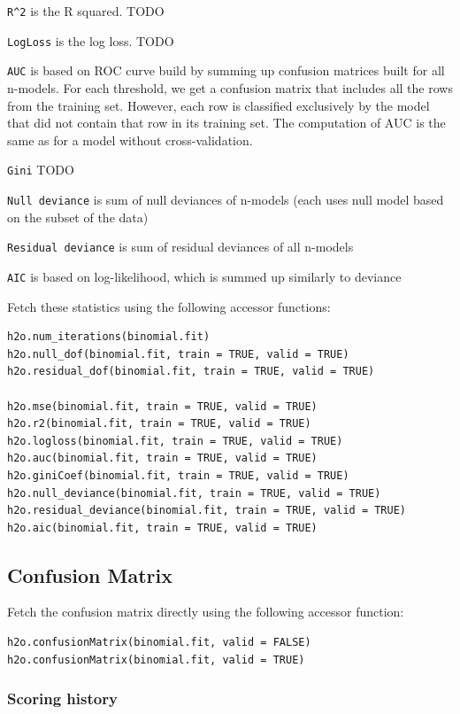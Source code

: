 \texttt{R\textasciicircum2} is the R squared.  TODO

\texttt{LogLoss} is the log loss.  TODO

\texttt{AUC} is based on ROC curve build  by summing up confusion matrices built for all n-models.
For each threshold, we get a confusion matrix that includes all the rows from the training set. However, each row
is classified exclusively by the model that did not contain that row in its training set. The computation of AUC is
the same as for a model without cross-validation.

\texttt{Gini}  TODO

\texttt{Null deviance} is sum of null deviances of n-models (each uses null model based on the subset of the data)

\texttt{Residual deviance} is sum of residual deviances of all n-models

\texttt{AIC} is based on log-likelihood, which is summed up similarly to deviance

Fetch these statistics using the following accessor functions:

\begin{lstlisting}[style=R]
h2o.num_iterations(binomial.fit)
h2o.null_dof(binomial.fit, train = TRUE, valid = TRUE)
h2o.residual_dof(binomial.fit, train = TRUE, valid = TRUE)

h2o.mse(binomial.fit, train = TRUE, valid = TRUE)
h2o.r2(binomial.fit, train = TRUE, valid = TRUE)
h2o.logloss(binomial.fit, train = TRUE, valid = TRUE)
h2o.auc(binomial.fit, train = TRUE, valid = TRUE)
h2o.giniCoef(binomial.fit, train = TRUE, valid = TRUE)
h2o.null_deviance(binomial.fit, train = TRUE, valid = TRUE)
h2o.residual_deviance(binomial.fit, train = TRUE, valid = TRUE)
h2o.aic(binomial.fit, train = TRUE, valid = TRUE)
\end{lstlisting}

\subsection{Confusion Matrix}

Fetch the confusion matrix directly using the following accessor function:

\begin{lstlisting}[style=R]
h2o.confusionMatrix(binomial.fit, valid = FALSE)
h2o.confusionMatrix(binomial.fit, valid = TRUE)
\end{lstlisting}

\subsubsection{Scoring history}

